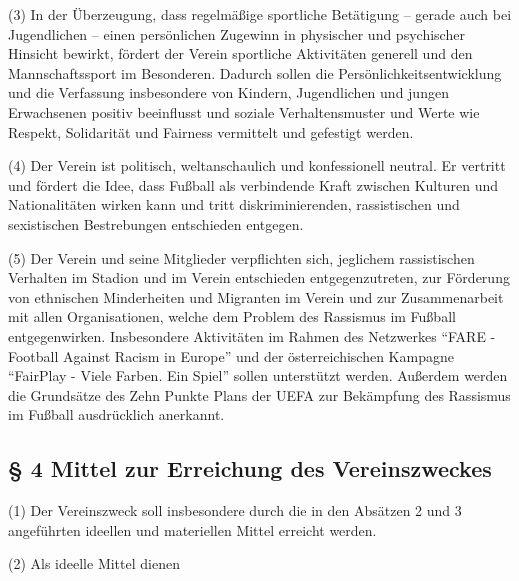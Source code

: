 \documentclass[11pt,a4paper]{article}
\begin{document}
(3)
In der Überzeugung, dass regelmäßige sportliche Betätigung – gerade auch bei Jugendlichen – einen persönlichen Zugewinn in physischer und psychischer Hinsicht bewirkt, fördert der Verein sportliche Aktivitäten generell und den Mannschaftssport im Besonderen.
Dadurch sollen die Persönlichkeitsentwicklung und die Verfassung insbesondere von Kindern, Jugendlichen und jungen Erwachsenen positiv beeinflusst und soziale Verhaltensmuster und Werte wie Respekt, Solidarität und Fairness vermittelt und gefestigt werden.

(4)
Der Verein ist politisch, weltanschaulich und konfessionell neutral.
Er vertritt und fördert die Idee, dass Fußball als verbindende Kraft zwischen Kulturen und Nationalitäten wirken kann und tritt diskriminierenden, rassistischen und sexistischen Bestrebungen entschieden entgegen.

(5)
Der Verein und seine Mitglieder verpflichten sich, jeglichem rassistischen Verhalten im Stadion und im Verein entschieden entgegenzutreten, zur Förderung von ethnischen Minderheiten und Migranten im Verein und zur Zusammenarbeit mit allen Organisationen, welche dem Problem des Rassismus im Fußball entgegenwirken.
Insbesondere Aktivitäten im Rahmen des Netzwerkes "`FARE - Football Against Racism in Europe"' und der österreichischen Kampagne "`FairPlay - Viele Farben. Ein Spiel"' sollen unterstützt werden.
Außerdem werden die Grundsätze des Zehn Punkte Plans der UEFA zur Bekämpfung des Rassismus im Fußball ausdrücklich anerkannt.

\subsection{§ 4
Mittel zur Erreichung des Vereinszweckes}

(1)
Der Vereinszweck soll insbesondere durch die in den Absätzen 2 und 3 angeführten ideellen und materiellen Mittel erreicht werden.

(2)
Als ideelle Mittel dienen
\end{document}

